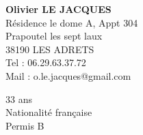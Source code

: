 \begin{chapeau}
	\begin{adresse}
		\textbf{Olivier LE JACQUES}\\
		Résidence le dome A, Appt 304\\
		Prapoutel les sept laux\\
		38190 LES ADRETS\\
		Tel : 06.29.63.37.72\\
		Mail : o.le.jacques@gmail.com\\
	\end{adresse}
	\begin{etatcivil}
		33 ans \\
        Nationalité française \\
		Permis B \\
	\end{etatcivil}
\end{chapeau}
